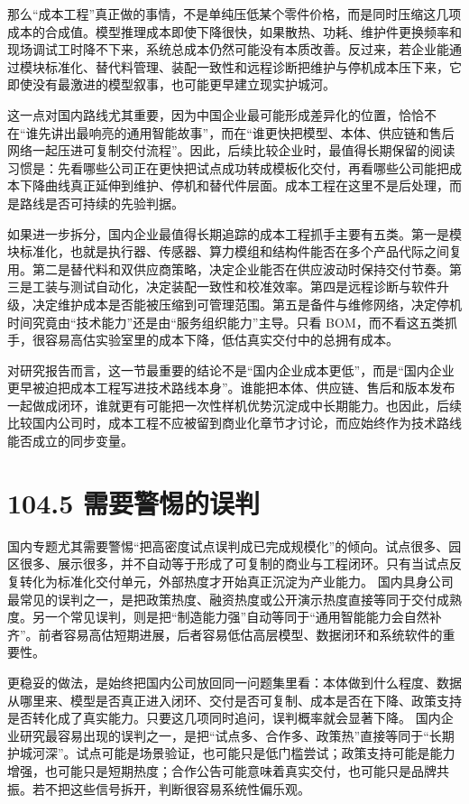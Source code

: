 那么“成本工程”真正做的事情，不是单纯压低某个零件价格，而是同时压缩这几项成本的合成值。模型推理成本即使下降很快，如果散热、功耗、维护件更换频率和现场调试工时降不下来，系统总成本仍然可能没有本质改善。反过来，若企业能通过模块标准化、替代料管理、装配一致性和远程诊断把维护与停机成本压下来，它即使没有最激进的模型叙事，也可能更早建立现实护城河。

这一点对国内路线尤其重要，因为中国企业最可能形成差异化的位置，恰恰不在“谁先讲出最响亮的通用智能故事”，而在“谁更快把模型、本体、供应链和售后网络一起压进可复制交付流程”。因此，后续比较企业时，最值得长期保留的阅读习惯是：先看哪些公司正在更快把试点成功转成模板化交付，再看哪些公司能把成本下降曲线真正延伸到维护、停机和替代件层面。成本工程在这里不是后处理，而是路线是否可持续的先验判据。

如果进一步拆分，国内企业最值得长期追踪的成本工程抓手主要有五类。第一是模块标准化，也就是执行器、传感器、算力模组和结构件能否在多个产品代际之间复用。第二是替代料和双供应商策略，决定企业能否在供应波动时保持交付节奏。第三是工装与测试自动化，决定装配一致性和校准效率。第四是远程诊断与软件升级，决定维护成本是否能被压缩到可管理范围。第五是备件与维修网络，决定停机时间究竟由“技术能力”还是由“服务组织能力”主导。只看 BOM，而不看这五类抓手，很容易高估实验室里的成本下降，低估真实交付中的总拥有成本。

对研究报告而言，这一节最重要的结论不是“国内企业成本更低”，而是“国内企业更早被迫把成本工程写进技术路线本身”。谁能把本体、供应链、售后和版本发布一起做成闭环，谁就更有可能把一次性样机优势沉淀成中长期能力。也因此，后续比较国内公司时，成本工程不应被留到商业化章节才讨论，而应始终作为技术路线能否成立的同步变量。

\section*{104.5 需要警惕的误判}


国内专题尤其需要警惕“把高密度试点误判成已完成规模化”的倾向。试点很多、园区很多、展示很多，并不自动等于形成了可复制的商业与工程闭环。只有当试点反复转化为标准化交付单元，外部热度才开始真正沉淀为产业能力。 国内具身公司最常见的误判之一，是把政策热度、融资热度或公开演示热度直接等同于交付成熟度。另一个常见误判，则是把“制造能力强”自动等同于“通用智能能力会自然补齐”。前者容易高估短期进展，后者容易低估高层模型、数据闭环和系统软件的重要性。

更稳妥的做法，是始终把国内公司放回同一问题集里看：本体做到什么程度、数据从哪里来、模型是否真正进入闭环、交付是否可复制、成本是否在下降、政策支持是否转化成了真实能力。只要这几项同时追问，误判概率就会显著下降。 国内企业研究最容易出现的误判之一，是把“试点多、合作多、政策热”直接等同于“长期护城河深”。试点可能是场景验证，也可能只是低门槛尝试；政策支持可能是能力增强，也可能只是短期热度；合作公告可能意味着真实交付，也可能只是品牌共振。若不把这些信号拆开，判断很容易系统性偏乐观。

